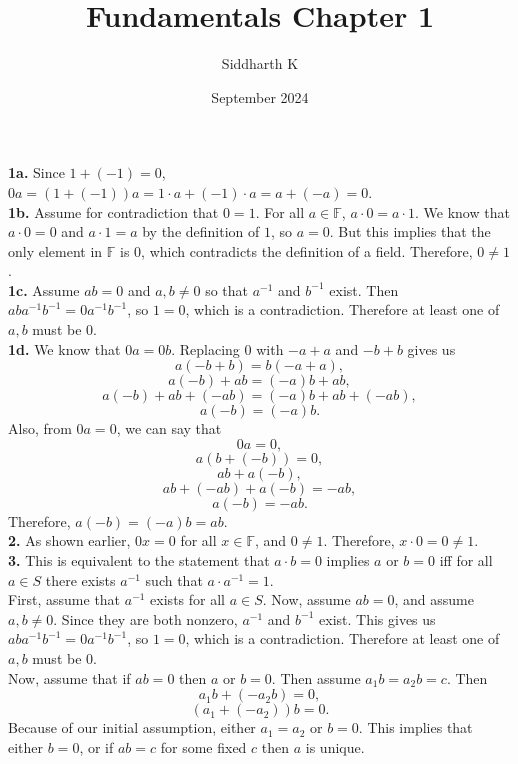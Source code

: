 \documentclass{article}
\title{Fundamentals Chapter 1}
\author{Siddharth K}
\date{September 2024}
\newcommand{\FF}{\mathbb{F}}
\begin{document}
\maketitle

\textbf{1a.} Since $1 + (-1) = 0$, $0a = (1 + (-1))a = 1\cdot a + (-1)\cdot a = a + (-a) = 0$. \\

\textbf{1b.} Assume for contradiction that $0 = 1$. For all $a \in \FF$, $a\cdot 0 = a\cdot 1$. We know that $a\cdot 0 = 0$ and $a\cdot 1 = a$ by the definition of $1$, so $a = 0$. But this implies that the only element in $\FF$ is $0$, which contradicts the definition of a field. Therefore, $0\neq 1$. \\

\textbf{1c.} Assume $ab = 0$ and $a, b \neq 0$ so that $a^{-1}$ and $b^{-1}$ exist. Then $aba^{-1}b^{-1} = 0a^{-1}b^{-1}$, so $1 = 0$, which is a contradiction. Therefore at least one of $a, b$ must be $0$. \\

\textbf{1d.} We know that $0a = 0b$. Replacing $0$ with $-a + a$ and $-b + b$ gives us $$a(-b + b) = b(-a + a),$$ $$a(-b) + ab = (-a)b + ab,$$ $$a(-b) + ab + (-ab) = (-a)b + ab + (-ab),$$ $$a(-b) = (-a)b.$$
Also, from $0a = 0$, we can say that $$0a = 0,$$ $$a(b + (-b)) = 0,$$ $$ab + a(-b),$$ $$ab + (-ab) + a(-b) = -ab,$$ $$a(-b) = -ab.$$ Therefore, $a(-b) = (-a)b = ab$. \\

\textbf{2.} As shown earlier, $0x = 0$ for all $x \in \FF$, and $0 \neq 1$. Therefore, $x \cdot 0 = 0 \neq 1$. \\

\textbf{3.} This is equivalent to the statement that $a\cdot b = 0$ implies $a$ or $b = 0$ iff for all $a \in S$ there exists $a^{-1}$ such that $a\cdot a^{-1} = 1$. \\

First, assume that $a^{-1}$ exists for all $a \in S$. Now, assume $ab = 0$, and assume $a, b \neq 0$. Since they are both nonzero, $a^{-1}$ and $b^{-1}$ exist. This gives us $aba^{-1}b^{-1} = 0a^{-1}b^{-1}$, so $1 = 0$, which is a contradiction. Therefore at least one of $a, b$ must be $0$. \\

Now, assume that if $ab = 0$ then $a$ or $b = 0$. Then assume $a_1 b = a_2 b = c$. Then $$a_1 b + (-a_2b) = 0,$$ $$(a_1 + (-a_2))b = 0.$$ Because of our initial assumption, either $a_1 = a_2$ or $b = 0$. This implies that either $b = 0$, or if $ab = c$ for some fixed $c$ then $a$ is unique. \\
\end{document}
